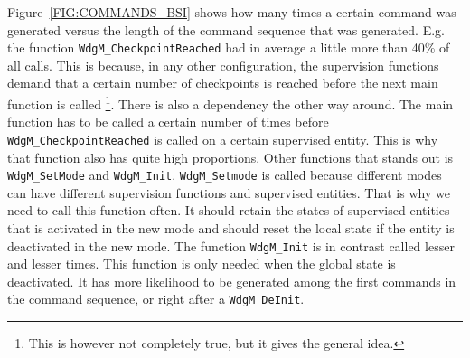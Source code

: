 Figure~\ref{FIG:COMMANDS_BSI} shows how many times a certain command was
generated versus the length of the command sequence that was generated. E.g. the
function \lstinline!WdgM_CheckpointReached! had in average a little more than
40\% of all calls. This is because, in any other configuration, the supervision
functions demand that a certain number of checkpoints is reached before the next
main function is called \footnote{This is however not completely true, but it
  gives the general idea.}. There is also a dependency the other way around. The
main function has to be called a certain number of times before
\lstinline!WdgM_CheckpointReached! is called on a certain supervised
entity. This is why that function also has quite high proportions. Other
functions that stands out is \lstinline!WdgM_SetMode! and \lstinline!WdgM_Init!.
\lstinline!WdgM_Setmode! is called because different modes can have different
supervision functions and supervised entities. That is why we need to call this
function often. It should retain the states of supervised entities that is
activated in the new mode and should reset the local state if the entity is
deactivated in the new mode. The function \lstinline!WdgM_Init! is in contrast
called lesser and lesser times. This function is only needed when the global
state is deactivated. It has more likelihood to be generated among the first
commands in the command sequence, or right after a \lstinline!WdgM_DeInit!.

